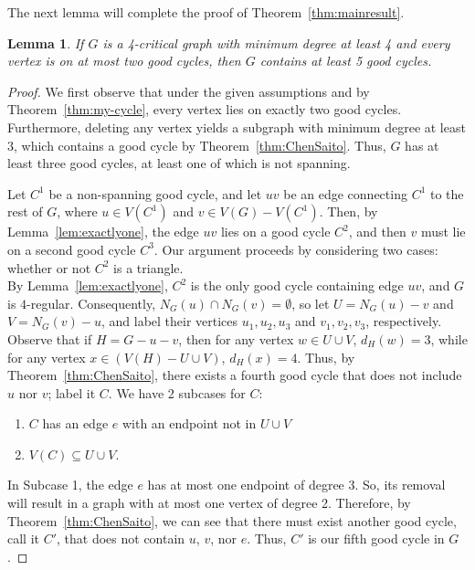 \documentclass[12pt]{article}
\numberwithin{theorem}{section}
\newtheorem{lem}[theorem]{Lemma}
\begin{document}
The next lemma will complete the proof of Theorem~\ref{thm:mainresult}.





\begin{lem}
\label{lem:4goodb}
    If $G$ is a 4-critical graph with minimum degree at least 4 and every vertex is on at most two good cycles, then $G$ contains at least 5 good cycles.
\end{lem}

\begin{proof}
    We first observe that under the given assumptions and by Theorem~\ref{thm:my-cycle}, every vertex lies on exactly two good cycles. Furthermore, deleting any vertex yields a subgraph with minimum degree at least 3, which contains a good cycle by Theorem~\ref{thm:ChenSaito}. Thus, $G$ has at least three good cycles, at least one of which is not spanning.

    Let $C^1$ be a non-spanning good cycle, and let $uv$ be an edge connecting $C^1$ to the rest of $G$, where $u \in V(C^1)$ and $v \in V(G)-V(C^1)$.  Then, by Lemma~\ref{lem:exactlyone}, the edge $uv$ lies on a good cycle $C^2$, and then $v$ must lie on a second good cycle $C^3$.  Our argument proceeds by considering two cases: whether or not $C^2$ is a triangle.\\


     By Lemma~\ref{lem:exactlyone}, $C^2$ is the only good cycle containing edge $uv$, and $G$ is $4$-regular. Consequently, $N_G(u) \cap N_G(v) = \emptyset$, so let $U = N_G(u)-v$ and $V = N_G(v)-u$, and label their vertices $u_1, u_2, u_3$ and $v_1, v_2, v_3$, respectively. Observe that if $H = G - u - v$, then for any vertex $w \in U \cup V$, $d_H(w) = 3$, while for any vertex $ x \in (V(H) - U \cup V)$, $d_H(x) = 4$. Thus, by Theorem~\ref{thm:ChenSaito}, there exists a fourth good cycle that does not include $u$ nor $v$; label it $C$. We have 2 subcases for $C$:

    \begin{enumerate}
        \item $C$ has an edge $e$ with an endpoint not in $U\cup V$
        \item $V(C) \subseteq U \cup V$.
    \end{enumerate}

    In Subcase 1, the edge $e$ has at most one endpoint of degree 3. So, its removal will result in a graph with at most one vertex of degree 2. Therefore, by Theorem~\ref{thm:ChenSaito}, we can see that there must exist another good cycle, call it $C'$, that does not contain $u$, $v$, nor $e$. Thus, $C'$ is our fifth good cycle in $G$.


\end{proof}
\end{document}
